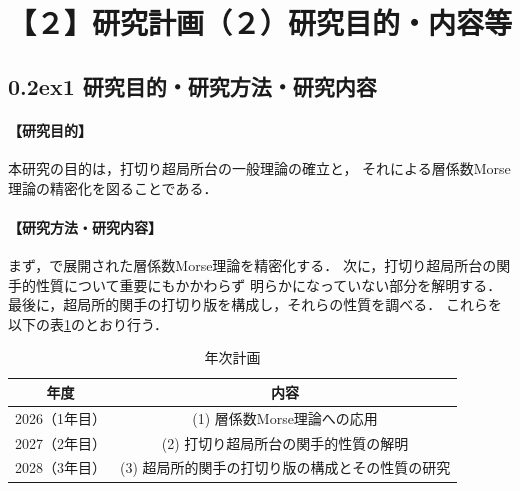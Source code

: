 \documentclass[10pt,a4paper,uplatex,dvipdfmx]{ujarticle} 		%
\newcommand{\研究課題名}{打切り超局所台の関手的性質の研究とMorse理論への応用}
\newcommand{\研究機関名}{北海道大学}
\newcommand{\研究代表者氏名}{大柴寿浩}
\newcommand{\ctext}[1]{\raise0.2ex\hbox{\textcircled{\scriptsize{#1}}}}
\begin{document}



\section{【２】研究計画（２）研究目的・内容等}
\vspace{-30pt}
\subsection*{\ctext{1} 研究目的・研究方法・研究内容}
\paragraph{【研究目的】}
本研究の目的は，打切り超局所台の一般理論の確立と，
それによる層係数Morse理論の精密化を図ることである．
\vspace{-10pt}
\paragraph{【研究方法・研究内容】}
まず，\cite{ST92}で展開された層係数Morse理論を精密化する．
次に，打切り超局所台の関手的性質について重要にもかかわらず
明らかになっていない部分を解明する．
最後に，超局所的関手の打切り版を構成し，それらの性質を調べる．
これらを以下の表\ref{tab1}のとおり行う．


\begin{table}[h]
	\vspace{-11pt}
\begin{center}
	\caption{年次計画}
	\label{tab1}
	\begin{tabular}{cc}\toprule
		年度 & 内容 \\\midrule
		2026（1年目）& (1) 層係数Morse理論への応用 \\
		2027（2年目）& (2) 打切り超局所台の関手的性質の解明\\
		2028（3年目）& (3) 超局所的関手の打切り版の構成とその性質の研究\\\bottomrule
	\end{tabular}
\end{center}
\vspace{-44pt}
\end{table}
\end{document}
